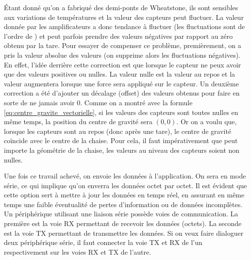 \documentclass{polytech/polytech}
\begin{document}
\'Etant donné qu'on a fabriqué des demi-ponts de Wheatstone, ils sont sensibles aux variations de températures et la valeur des capteurs peut fluctuer. 
La valeur donnée par les amplificateurs a donc tendance à fluctuer (les fluctuations sont de l'ordre de ) et peut parfois prendre des valeurs négatives par rapport au zéro obtenu par la tare.
 Pour essayer de compenser ce problème, premièrement, on a pris la valeur absolue des valeurs (on supprime alors les fluctuations négatives). 
En effet, l'idée derrière cette correction est que lorsque le capteur ne peux avoir que des valeurs positives ou nulles.
 La valeur nulle est la valeur au repos et la valeur augmentera lorsque une force sera appliqué sur le capteur.
  Un deuxième correction a été d'ajouter un décalage (offset) des valeurs obtenus pour faire en sorte de ne jamais avoir 0. 
  Comme on a montré avec la formule \eqref{eq:centre_gravite_vectorielle}, si les valeurs des capteurs sont toutes nulles en même temps, la position du centre de gravité sera $(0, 0)$. 
  Or on a voulu que, lorsque les capteurs sont au repos (donc après une tare), le centre de gravité coïncide avec le centre de la chaise.
   Pour cela, il faut impérativement que peut importe la géométrie de la chaise, les valeurs au niveau des capteurs soient non nulles.



Une fois ce travail achevé, on envoie les données à l'application. On sera en mode série, ce qui implique qu'on enverra les données octet par octet. Il est évident que cette option sert à mettre à jour les données en temps réel, en assurant en même temps une faible éventualité de pertes d'information ou de données incomplètes.
Un périphérique utilisant une liaison série possède voies de communication. La première est la voie RX permettant de recevoir les données (octets). La seconde est la voie TX permettant de transmettre les données.  Si on veux faire dialoguer deux périphérique série, il faut connecter la voie TX et RX de l'un respectivement sur les voies RX et TX de l'autre.
\end{document}
